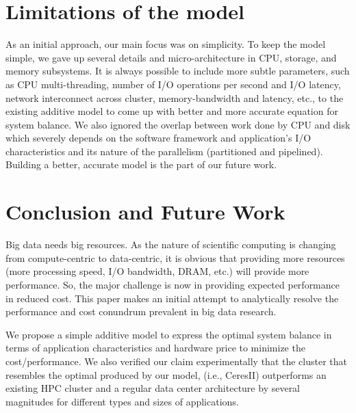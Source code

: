 \documentclass[journal]{IEEEtran}
\begin{document}

\section{Limitations of the model} \label{sec:Limitations}
As an initial approach, our main focus was on simplicity. To keep the model simple, we gave up several details and micro-architecture in CPU, storage, and memory subsystems. It is always possible to include more subtle parameters, such as CPU multi-threading, number of I/O operations per second and I/O latency, network interconnect across cluster, memory-bandwidth and latency, etc., to the existing additive model to come up with better and more accurate equation for system balance. We also ignored the overlap between work done by CPU and disk which severely depends on the software framework and application's I/O characteristics and its nature of the parallelism (partitioned and pipelined). Building a better, accurate model is the part of our future work.  

\section{Conclusion and Future Work} \label{sec:Conclusion}
Big data needs big resources. As the nature of scientific computing is changing from compute-centric to data-centric, it is obvious that providing more resources (more processing speed, I/O bandwidth, DRAM, etc.) will provide more performance. So, the major challenge is now in  providing expected performance in reduced cost. This paper makes an initial attempt to analytically resolve the performance and cost conundrum prevalent in big data research.

We propose a simple additive model to express the optimal system balance in terms of application characteristics and hardware price to minimize the cost/performance.   We also verified our claim experimentally that the cluster that resembles the optimal produced by our model, (i.e., CeresII) outperforms an existing HPC cluster and a regular data center architecture by several magnitudes for different types and sizes of applications.
\end{document}

